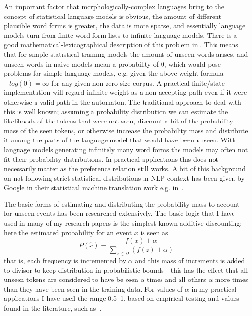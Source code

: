 \documentclass[officiallayout]{unihelcompling}
\begin{document}
An important factor that morphologically-complex languages bring to the concept
of statistical language models is obvious, the amount of different plausible
word forms is greater, the data is more sparse, and essentially language models
turn from finite word-form lists to infinite language models.  There is a good
mathematical-lexicographical description of this problem in
\citet{kornai2002many}. This means that for simple statistical training models
the amount of unseen words arises, and unseen words in naive models mean a
probability of $0$, which would pose problems for simple language models, e.g.
given the above weight formula $-log(0) = \infty$ for any given non-zero-size
corpus. A practical finite\-/state implementation will regard infinite weight as
a non-accepting path even if it were otherwise a valid path in the automaton.
The traditional approach to deal with this is well known; assuming a
probability distribution we can estimate the likelihoods of the tokens that
were not seen, discount a bit of the probability mass of the seen tokens, or
otherwise increase the probability mass and distribute it among the parts of
the language model that would have been unseen. With language models generating
infinitely many word forms the models may often not fit their probability
distributions. In practical applications this does not necessarily matter as
the preference relation still works. A bit of this background on not following
strict statistical distributions in NLP context has been given by Google in
their statistical machine translation work e.g.  in~\citet{brants2007large}.

The basic forms of estimating and distributing the probability mass to account
for unseen events has been researched extensively. The basic logic that I have
used in many of my research papers is the simplest known additive discounting:
here the estimated probability for an event $x$ is seen as 
\begin{equation}
    P(\hat{x}) = \frac{f(x) + \alpha}{\sum_{z \in \mathcal{D}}(f(z) + \alpha)}
\end{equation}
that is, each frequency is incremented by $\alpha$ and this mass of increments
is added to divisor to keep distribution in probabilistic bounds---this has the
effect that all unseen tokens are considered to have be seen $\alpha$ times and
all others $\alpha$ more times than they have been seen in the training data.
For values of $\alpha$ in my practical applications I have used the range
0.5--1, based on empirical testing and values found in the literature, such
as~\citet{manning1999foundations}.
\end{document}

